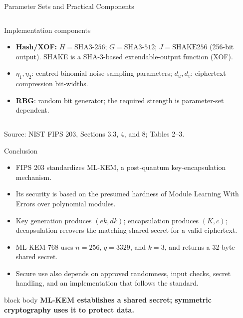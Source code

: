 \documentclass[aspectratio=169,11pt]{beamer}
\newcommand{\source}[1]{\par\vspace{-0.15cm}\hfill{\fontsize{4.5}{5.2}\selectfont\color{Slate!65}Source: NIST FIPS 203, #1.}}
\begin{document}
\begin{frame}{Parameter Sets and Practical Components}
\begin{columns}[T,onlytextwidth]
\begin{block}{Implementation components}
\begin{itemize}
          \item \textbf{Hash/XOF:} $H=\mathrm{SHA3\mbox{-}256}$; $G=\mathrm{SHA3\mbox{-}512}$; $J=\mathrm{SHAKE256}$ (256-bit output). SHAKE is a SHA-3-based extendable-output function (XOF).
          \item $\eta_1,\eta_2$: centred-binomial noise-sampling parameters; $d_u,d_v$: ciphertext compression bit-widths.
          \item \textbf{RBG}: random bit generator; the required strength is parameter-set dependent.
        \end{itemize}
      \end{block}
  \end{columns}
  \source{Sections 3.3, 4, and 8; Tables 2--3}
\end{frame}

\begin{frame}{Conclusion}
  \begin{itemize}
    \setlength{\itemsep}{0.34em}
    \item FIPS 203 standardizes ML-KEM, a post-quantum key-encapsulation mechanism.
    \item Its security is based on the presumed hardness of Module Learning With Errors over polynomial modules.
    \item Key generation produces $(ek,dk)$; encapsulation produces $(K,c)$; decapsulation recovers the matching shared secret for a valid ciphertext.
    \item ML-KEM-768 uses $n=256$, $q=3329$, and $k=3$, and returns a 32-byte shared secret.
    \item Secure use also depends on approved randomness, input checks, secret handling, and an implementation that follows the standard.
  \end{itemize}
  \vspace{0.12cm}
  \begin{center}
    \begin{beamercolorbox}[rounded=true,sep=0.52em,wd=\linewidth,center]{block body}
      \normalsize\color{Navy}\textbf{ML-KEM establishes a shared secret; symmetric cryptography uses it to protect data.}
    \end{beamercolorbox}
  \end{center}
\end{frame}
\end{document}
